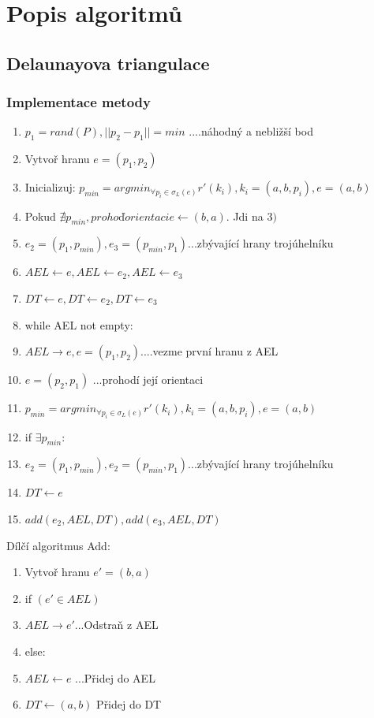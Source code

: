 \documentclass[a4paper, 12pt]{article}
\begin{document}
\clearpage
\section{Popis algoritmů}

\subsection{Delaunayova triangulace}

\vspace{1.5cm}
\subsubsection{Implementace metody}
\begin{enumerate}
\item $ p_1 = rand(P), ||p_2-p_1|| = min $ ....náhodný a nebližší bod
\item Vytvoř hranu $ e = (p_1,p_2) $ 
\item Inicializuj: $p_{min} = arg min_{\forall p_i\in\sigma_L(e)} r'(k_i), k_i = (a, b, p_i), e = (a,b)$
\item Pokud $ \nexists p_{min}, prohoď orientaci e \longleftarrow (b,a) $. Jdi na $3)$
\item $e_2 = (p_1,p_{min}), e_3 = (p_{min},p_1) $...zbývající hrany trojúhelníku
\item $AEL \longleftarrow e, AEL \longleftarrow e_2, AEL \longleftarrow e_3 $
\item $DT \longleftarrow e, DT \longleftarrow e_2, DT \longleftarrow e_3 $ 
\item while AEL not empty:
\item \hspace {1cm} $AEL  \longrightarrow e, e = (p_1, p_2) $....vezme první hranu z AEL
\item \hspace {1cm}$ e = (p_2, p_1)$ ...prohodí její orientaci
\item \hspace {1cm} $p_{min} = arg min_{\forall p_i\in\sigma_L(e)} r'(k_i), k_i = (a, b, p_i), e = (a,b) $
\item \hspace {1cm} if $ \exists p_{min}:$
\item \hspace {2cm} $e_2 = (p_1,p_{min}), e_2 = (p_{min},p_1) $...zbývající hrany trojúhelníku
\item \hspace {2cm} $DT \longleftarrow e  $  
\item \hspace {2cm} $ add(e_2,AEL,DT), add(e_3,AEL,DT)$
\end{enumerate}

Dílčí algoritmus Add:
\begin{enumerate}
	\item Vytvoř hranu $e' = (b,a)$
	\item if $(e' \in AEL)$
	\item \hspace {1cm} $ AEL \longrightarrow e'$...Odstraň z AEL
	\item else:
	\item \hspace {1cm} $ AEL \longleftarrow e$ ...Přidej do AEL
	\item $DT\longleftarrow (a,b)$ Přidej do DT
\end{enumerate}
\end{document}
